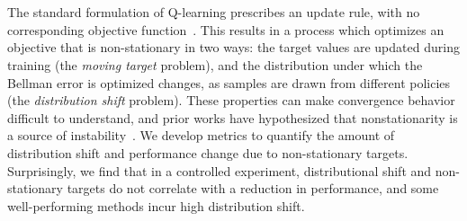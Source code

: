 ~


~

The standard formulation of Q-learning prescribes an update rule, with no corresponding objective function~\citep{Sutton09b}. This results in a process which optimizes an objective that is non-stationary in two ways: the target values are updated during training (the \emph{moving target} problem), and the distribution under which the Bellman error is optimized changes, as samples are drawn from different policies (the \emph{distribution shift} problem). These properties can make convergence behavior difficult to understand, and prior works have hypothesized that nonstationarity is a source of instability~\citep{Mnih2015, Lillicrap2015}. {We develop metrics to quantify the amount of distribution shift and performance change due to non-stationary targets. Surprisingly, we find that in a controlled experiment, distributional shift and non-stationary targets do not correlate with a reduction in performance, and some well-performing methods incur high distribution shift.}



